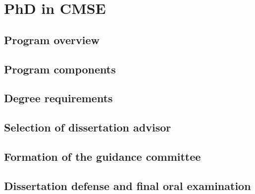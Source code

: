 \section{PhD in CMSE}
\label{sec:ms}

\subsection{Program overview}

\subsection{Program components}

\subsection{Degree requirements}

\subsection{Selection of dissertation advisor}

\subsection{Formation of the guidance committee}

\subsection{Dissertation defense and final oral examination}
